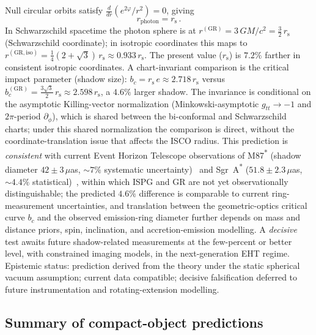 \documentclass[aps,prd,onecolumn,superscriptaddress,nofootinbib,showpacs,12pt]{revtex4-2}
\newcommand{\rs}{r_{\mathrm{s}}}
\begin{document}
Null circular orbits satisfy
$\frac{d}{dr}(e^{2\varphi}/r^{2}) = 0$, giving
\begin{equation}\label{eq:photon}
  r_{\mathrm{photon}} = \rs\,.
\end{equation}
In Schwarzschild spacetime the photon sphere is at
$r^{(\mathrm{GR})} = 3\,GM/c^{2} = \frac{3}{2}\,\rs$
(Schwarzschild coordinate); in isotropic coordinates
this maps to $r^{(\mathrm{GR,iso})} =
\tfrac{1}{4}(2+\sqrt{3})\,\rs \approx 0.933\,\rs$.
The present value ($\rs$) is $7.2\%$ farther in
consistent isotropic coordinates.  A chart-invariant
comparison is the critical impact parameter (shadow size):
$b_{c} = \rs\,e \approx 2.718\,\rs$ versus
$b_{c}^{(\mathrm{GR})} = \tfrac{3\sqrt{3}}{2}\,\rs
\approx 2.598\,\rs$, a $4.6\%$ larger shadow.  The
invariance is conditional on the asymptotic Killing-vector
normalization (Minkowski-asymptotic $g_{tt}\to-1$ and
$2\pi$-period $\partial_\phi$), which is shared between the
bi-conformal and Schwarzschild charts; under this shared
normalization the comparison is direct, without the
coordinate-translation issue that affects the ISCO radius.
This prediction is \emph{consistent} with current Event
Horizon Telescope observations of M87\textsuperscript{*}
(shadow diameter $42\pm 3\,\mu$as, $\sim 7\%$ systematic
uncertainty)~\cite{EHT2019M87,EHT2024M87} and
Sgr~A\textsuperscript{*} ($51.8\pm 2.3\,\mu$as,
$\sim 4.4\%$ statistical)~\cite{EHT2022}, within which ISPG
and GR are not yet observationally distinguishable; the
predicted $4.6\%$ difference is comparable to current
ring-measurement uncertainties, and translation between the
geometric-optics critical curve $b_c$ and the observed
emission-ring diameter further depends on mass and distance
priors, spin, inclination, and accretion-emission modelling.
A \emph{decisive} test awaits future shadow-related
measurements at the few-percent or better level, with
constrained imaging models, in the next-generation EHT
regime.  Epistemic status: prediction derived from the
theory under the static spherical vacuum assumption; current
data compatible; decisive falsification deferred to future
instrumentation and rotating-extension modelling.

\subsection{Summary of compact-object predictions}
\label{sec:compact_summary}
\end{document}
